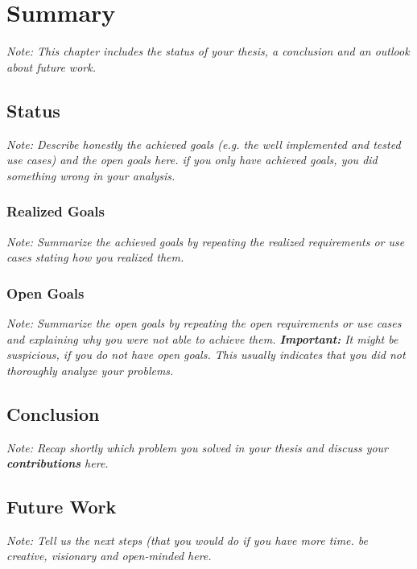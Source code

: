 \documentclass[a4paper,12pt,twoside]{report}
\begin{document}

\chapter{Summary}

\textit{Note: This chapter includes the status of your thesis, a conclusion and an outlook about future work.}

\section{Status}

\textit{Note: Describe honestly the achieved goals (e.g. the well implemented and tested use cases) and the open goals here. if you only have achieved goals, you did something wrong in your analysis.}

\subsection{Realized Goals}

\textit{Note: Summarize the achieved goals by repeating the realized requirements or use cases stating how you realized them.}

\subsection{Open Goals}

\textit{Note: Summarize the open goals by repeating the open requirements or use cases and explaining why you were not able to achieve them. \textbf{Important:} It might be suspicious, if you do not have open goals. This usually indicates that you did not thoroughly analyze your problems.}

\section{Conclusion}

\textit{Note: Recap shortly which problem you solved in your thesis and discuss your \textbf{contributions} here.}

\section{Future Work}

\textit{Note: Tell us the next steps  (that you would do if you have more time. be creative, visionary and open-minded here.}
\end{document}
